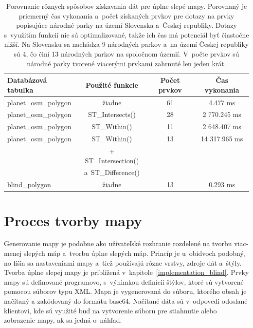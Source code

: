 \begin{table}[hbt]
	\centering
    \begin{tabular}{|l|c|c|c|}
        \hline
        \bf Databázová tabuľka & \bf Použité funkcie & \bf Počet prvkov & \bf Čas vykonania \rm \\
        \hline
        planet\_osm\_polygon & žiadne & 61 & 4.477 ms \\
        \hline
        planet\_osm\_polygon & ST\_Intersects() & 28 & 2 770.245 ms \\
        \hline
        planet\_osm\_polygon & ST\_Within() & 11 & 2 648.407 ms \\
        \hline
        planet\_osm\_polygon & ST\_Within() & 13 & 14 317.965 ms \\
        & + ST\_Intersection() & & \\
        & a~ST\_Difference() & & \\
        \hline
        blind\_polygon & žiadne & 13 & 0.293 ms \\
        \hline
    \end{tabular}
    \vskip6pt
	\caption{Porovnanie rôznych spôsobov získavania dát pre úplne slepé mapy. Porovnaný je priemerný čas vykonania a~počet získaných prvkov pre dotazy na prvky popisujúce národné parky na území Slovenska a~Českej republiky. Dotazy s~využitím funkcií nie sú optimalizované, takže ich čas má potenciál byť čiastočne nižší. Na Slovensku sa nachádza 9 národných parkov a~na území Českej republiky sú 4, čo činí 13 národných parkov na spoločnom územií. V~počte prvkov sú národné parky tvorené viacerými prvkami zahrnuté len jeden krát.}
    \vskip6pt
	\label{db_compare}
\end{table}

\section{Proces tvorby mapy}
Generovanie mapy je podobne ako užívateľské rozhranie rozdelené na tvorbu viac-menej slepých máp a~tvorbu úplne slepých máp. Princíp je u~obidvoch podobný, no líšia sa nastaveniami mapy a~tiež používajú rôzne vrstvy, zdroje dát a~štýly. Tvorba úplne slepej mapy je priblížená v~kapitole~\ref{implementation_blind}. Prvky mapy sú definované programovo, s~výnimkou definícií štýlov, ktoré sú vytvorené pomocou súborov typu XML. Mapa je vygenerovaná do súboru, ktorého obsah je načítaný a zakódovaný do formátu base64. Načítané dáta sú v~odpovedi odoslané klientovi, kde sú využité buď na vytvorenie súboru pre stiahnutie alebo zobrazenie mapy, ak sa jedná o~náhľad.

